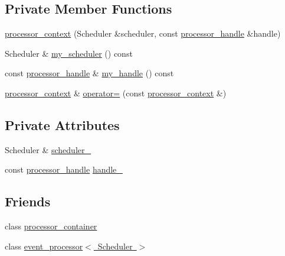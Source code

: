 \subsection*{Private Member Functions}
\begin{DoxyCompactItemize}
\item 
\mbox{\hyperlink{classboost_1_1statechart_1_1processor__container_1_1processor__context_ab20ad0fc099299597efa882e05f354a2}{processor\+\_\+context}} (Scheduler \&scheduler, const \mbox{\hyperlink{classboost_1_1statechart_1_1processor__container_a82ebbffaed81d7b99119ae0e892f6411}{processor\+\_\+handle}} \&handle)
\item 
Scheduler \& \mbox{\hyperlink{classboost_1_1statechart_1_1processor__container_1_1processor__context_a8a45613f4b0452ad6abb59a3f23010db}{my\+\_\+scheduler}} () const
\item 
const \mbox{\hyperlink{classboost_1_1statechart_1_1processor__container_a82ebbffaed81d7b99119ae0e892f6411}{processor\+\_\+handle}} \& \mbox{\hyperlink{classboost_1_1statechart_1_1processor__container_1_1processor__context_a560d9a202d3c0b08f963ab8002953997}{my\+\_\+handle}} () const
\item 
\mbox{\hyperlink{classboost_1_1statechart_1_1processor__container_1_1processor__context}{processor\+\_\+context}} \& \mbox{\hyperlink{classboost_1_1statechart_1_1processor__container_1_1processor__context_a82c0887c5327c4357c187549152e3811}{operator=}} (const \mbox{\hyperlink{classboost_1_1statechart_1_1processor__container_1_1processor__context}{processor\+\_\+context}} \&)
\end{DoxyCompactItemize}
\subsection*{Private Attributes}
\begin{DoxyCompactItemize}
\item 
Scheduler \& \mbox{\hyperlink{classboost_1_1statechart_1_1processor__container_1_1processor__context_ac3c7de353368f931c3dce4b074353bc6}{scheduler\+\_\+}}
\item 
const \mbox{\hyperlink{classboost_1_1statechart_1_1processor__container_a82ebbffaed81d7b99119ae0e892f6411}{processor\+\_\+handle}} \mbox{\hyperlink{classboost_1_1statechart_1_1processor__container_1_1processor__context_aa3497198f680385f98ce0290ee59e7f2}{handle\+\_\+}}
\end{DoxyCompactItemize}
\subsection*{Friends}
\begin{DoxyCompactItemize}
\item 
class \mbox{\hyperlink{classboost_1_1statechart_1_1processor__container_1_1processor__context_ad71a9b1bd035b6d86f295c6ac1826e38}{processor\+\_\+container}}
\item 
class \mbox{\hyperlink{classboost_1_1statechart_1_1processor__container_1_1processor__context_ab7e5334f86946211938fa5d51a3fcfd2}{event\+\_\+processor$<$ Scheduler $>$}}
\end{DoxyCompactItemize}


